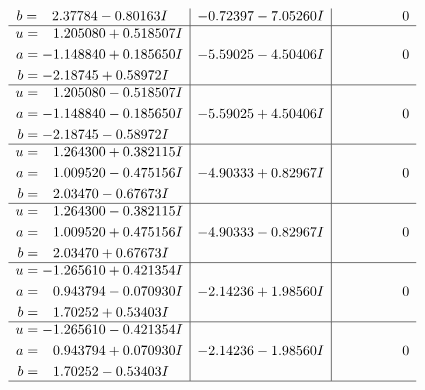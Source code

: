 \documentclass[1p]{elsarticle_modified}
\theoremstyle{definition}
\begin{document}
$$\begin{array}{c|c|c}
\begin{aligned}
b &= \phantom{-}2.37784 - 0.80163 I\end{aligned}
 & -0.72397 - 7.05260 I & \phantom{-0.000000 } 0 \\ \hline\begin{aligned}
u &= \phantom{-}1.205080 + 0.518507 I \\
a &= -1.148840 + 0.185650 I \\
b &= -2.18745 + 0.58972 I\end{aligned}
 & -5.59025 - 4.50406 I & \phantom{-0.000000 } 0 \\ \hline\begin{aligned}
u &= \phantom{-}1.205080 - 0.518507 I \\
a &= -1.148840 - 0.185650 I \\
b &= -2.18745 - 0.58972 I\end{aligned}
 & -5.59025 + 4.50406 I & \phantom{-0.000000 } 0 \\ \hline\begin{aligned}
u &= \phantom{-}1.264300 + 0.382115 I \\
a &= \phantom{-}1.009520 - 0.475156 I \\
b &= \phantom{-}2.03470 - 0.67673 I\end{aligned}
 & -4.90333 + 0.82967 I & \phantom{-0.000000 } 0 \\ \hline\begin{aligned}
u &= \phantom{-}1.264300 - 0.382115 I \\
a &= \phantom{-}1.009520 + 0.475156 I \\
b &= \phantom{-}2.03470 + 0.67673 I\end{aligned}
 & -4.90333 - 0.82967 I & \phantom{-0.000000 } 0 \\ \hline\begin{aligned}
u &= -1.265610 + 0.421354 I \\
a &= \phantom{-}0.943794 - 0.070930 I \\
b &= \phantom{-}1.70252 + 0.53403 I\end{aligned}
 & -2.14236 + 1.98560 I & \phantom{-0.000000 } 0 \\ \hline\begin{aligned}
u &= -1.265610 - 0.421354 I \\
a &= \phantom{-}0.943794 + 0.070930 I \\
b &= \phantom{-}1.70252 - 0.53403 I\end{aligned}
 & -2.14236 - 1.98560 I & \phantom{-0.000000 } 0\\
 \hline 
 \end{array}$$\newpage$$\begin{array}{c|c|c}  

\end{array}$$
\end{document}
